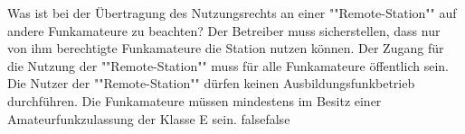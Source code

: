     {Was ist bei der Übertragung des Nutzungsrechts an einer ""Remote-Station"" auf andere Funkamateure zu beachten?}
    {Der Betreiber muss sicherstellen, dass nur von ihm berechtigte Funkamateure die Station nutzen können.}
    {Der Zugang für die Nutzung der ""Remote-Station"" muss für alle Funkamateure öffentlich sein.}
    {Die Nutzer der ""Remote-Station"" dürfen keinen Ausbildungsfunkbetrieb durchführen.}
    {Die Funkamateure müssen mindestens im Besitz einer Amateurfunkzulassung der Klasse E sein.}
    {false}{false}